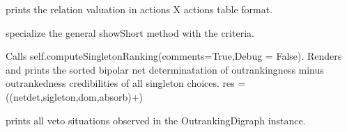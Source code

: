 \documentclass[letterpaper,10pt,english]{sphinxmanual}
\begin{document}
\begin{fulllineitems}
\begin{fulllineitems}
\end{fulllineitems}


\begin{fulllineitems}
\label{techDoc:outrankingDigraphs.OutrankingDigraph.showRelationTable}
prints the relation valuation in actions X actions table format.

\end{fulllineitems}


\begin{fulllineitems}
\label{techDoc:outrankingDigraphs.OutrankingDigraph.showShort}
specialize the general showShort method with the criteria.

\end{fulllineitems}


\begin{fulllineitems}
\label{techDoc:outrankingDigraphs.OutrankingDigraph.showSingletonRanking}
Calls self.computeSingletonRanking(comments=True,Debug = False).
Renders and prints the sorted bipolar net determinatation of outrankingness
minus outrankedness credibilities of all singleton choices.
res = ((netdet,sigleton,dom,absorb)+)

\end{fulllineitems}


\begin{fulllineitems}
\label{techDoc:outrankingDigraphs.OutrankingDigraph.showVetos}
prints all veto situations observed in the OutrankingDigraph instance.

\end{fulllineitems}


\end{fulllineitems}
\end{document}
